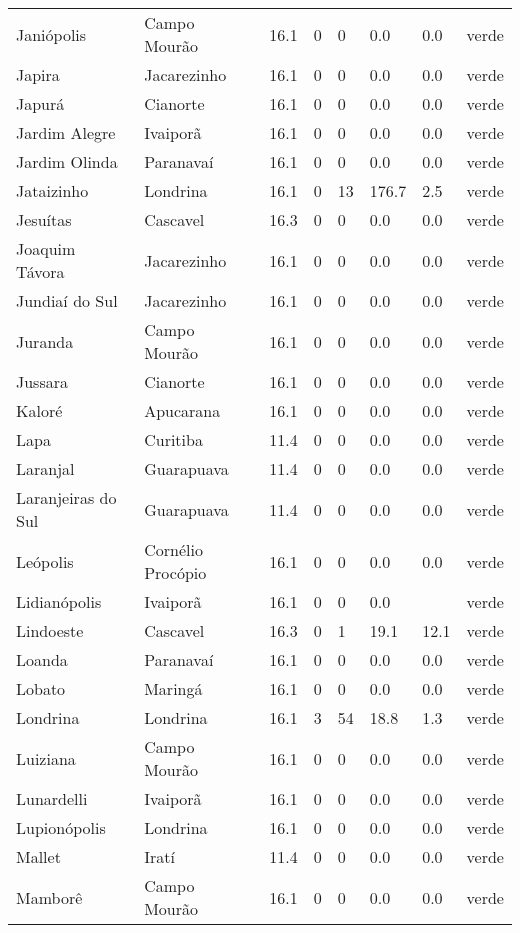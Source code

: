 \begin{longtable}{l|lllllll}
  Janiópolis & Campo Mourão & 16.1 & 0 & 0 & 0.0 & 0.0 & verde \\ 
  Japira & Jacarezinho & 16.1 & 0 & 0 & 0.0 & 0.0 & verde \\ 
  Japurá & Cianorte & 16.1 & 0 & 0 & 0.0 & 0.0 & verde \\ 
  Jardim Alegre & Ivaiporã & 16.1 & 0 & 0 & 0.0 & 0.0 & verde \\ 
  Jardim Olinda & Paranavaí & 16.1 & 0 & 0 & 0.0 & 0.0 & verde \\ 
  Jataizinho & Londrina & 16.1 & 0 & 13 & 176.7 & 2.5 & verde \\ 
  Jesuítas & Cascavel & 16.3 & 0 & 0 & 0.0 & 0.0 & verde \\ 
  Joaquim Távora & Jacarezinho & 16.1 & 0 & 0 & 0.0 & 0.0 & verde \\ 
  Jundiaí do Sul & Jacarezinho & 16.1 & 0 & 0 & 0.0 & 0.0 & verde \\ 
  Juranda & Campo Mourão & 16.1 & 0 & 0 & 0.0 & 0.0 & verde \\ 
  Jussara & Cianorte & 16.1 & 0 & 0 & 0.0 & 0.0 & verde \\ 
  Kaloré & Apucarana & 16.1 & 0 & 0 & 0.0 & 0.0 & verde \\ 
  Lapa & Curitiba & 11.4 & 0 & 0 & 0.0 & 0.0 & verde \\ 
  Laranjal & Guarapuava & 11.4 & 0 & 0 & 0.0 & 0.0 & verde \\ 
  Laranjeiras do Sul & Guarapuava & 11.4 & 0 & 0 & 0.0 & 0.0 & verde \\ 
  Leópolis & Cornélio Procópio & 16.1 & 0 & 0 & 0.0 & 0.0 & verde \\ 
  Lidianópolis & Ivaiporã & 16.1 & 0 & 0 & 0.0 &  & verde \\ 
  Lindoeste & Cascavel & 16.3 & 0 & 1 & 19.1 & 12.1 & verde \\ 
  Loanda & Paranavaí & 16.1 & 0 & 0 & 0.0 & 0.0 & verde \\ 
  Lobato & Maringá & 16.1 & 0 & 0 & 0.0 & 0.0 & verde \\ 
  Londrina & Londrina & 16.1 & 3 & 54 & 18.8 & 1.3 & verde \\ 
  Luiziana & Campo Mourão & 16.1 & 0 & 0 & 0.0 & 0.0 & verde \\ 
  Lunardelli & Ivaiporã & 16.1 & 0 & 0 & 0.0 & 0.0 & verde \\ 
  Lupionópolis & Londrina & 16.1 & 0 & 0 & 0.0 & 0.0 & verde \\ 
  Mallet & Iratí & 11.4 & 0 & 0 & 0.0 & 0.0 & verde \\ 
  Mamborê & Campo Mourão & 16.1 & 0 & 0 & 0.0 & 0.0 & verde \\ 

\end{longtable}

